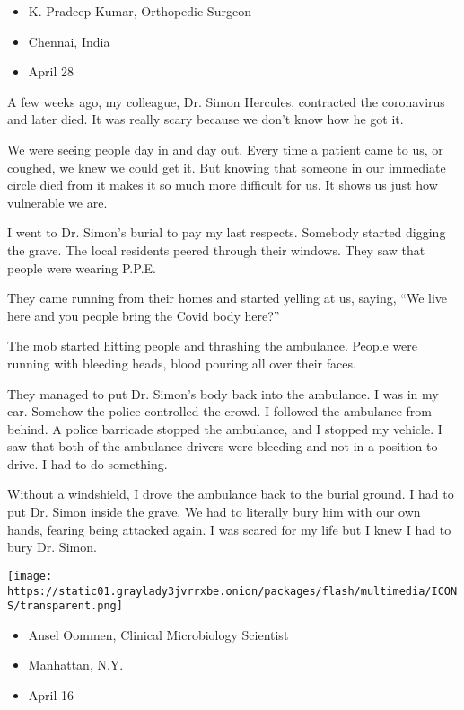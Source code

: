 \begin{itemize}
\tightlist
\item
  K. Pradeep Kumar, Orthopedic Surgeon
\item
  Chennai, India
\item
  April 28
\end{itemize}

A few weeks ago, my colleague, Dr. Simon Hercules, contracted the
coronavirus and later died. It was really scary because we don't know
how he got it.

We were seeing people day in and day out. Every time a patient came to
us, or coughed, we knew we could get it. But knowing that someone in our
immediate circle died from it makes it so much more difficult for us. It
shows us just how vulnerable we are.

I went to Dr. Simon's burial to pay my last respects. Somebody started
digging the grave. The local residents peered through their windows.
They saw that people were wearing P.P.E.

They came running from their homes and started yelling at us, saying,
``We live here and you people bring the Covid body here?''

The mob started hitting people and thrashing the ambulance. People were
running with bleeding heads, blood pouring all over their faces.

They managed to put Dr. Simon's body back into the ambulance. I was in
my car. Somehow the police controlled the crowd. I followed the
ambulance from behind. A police barricade stopped the ambulance, and I
stopped my vehicle. I saw that both of the ambulance drivers were
bleeding and not in a position to drive. I had to do something.

Without a windshield, I drove the ambulance back to the burial ground. I
had to put Dr. Simon inside the grave. We had to literally bury him with
our own hands, fearing being attacked again. I was scared for my life
but I knew I had to bury Dr. Simon.

\texttt{[image: https://static01.graylady3jvrrxbe.onion/packages/flash/multimedia/ICONS/transparent.png]}

\begin{itemize}
\tightlist
\item
  Ansel Oommen, Clinical Microbiology Scientist
\item
  Manhattan, N.Y.
\item
  April 16
\end{itemize}

